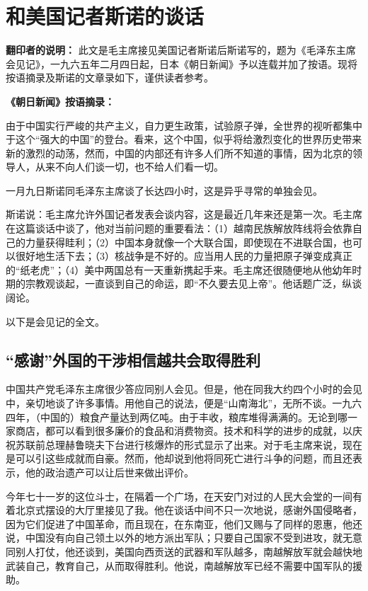 \section[和美国记者斯诺的谈话（一九六五年一月九日）]{和美国记者斯诺的谈话}


\textbf{翻印者的说明：} {\kaishu 此文是毛主席接见美国记者斯诺后斯诺写的，题为《毛泽东主席会见记》，一九六五年二月四日起，日本《朝日新闻》予以连载并加了按语。现将按语摘录及斯诺的文章录如下，谨供读者参考。}

\textbf{《朝日新闻》按语摘录：}

{\kaishu 
由于中国实行严峻的共产主义，自力更生政策，试验原子弹，全世界的视听都集中于这个“强大的中国”的登台。看来，这个中国，似乎将给激烈变化的世界历史带来新的激烈的动荡，然而，中国的内部还有许多人们所不知道的事情，因为北京的领导人，从来不向人们谈一切，也不给人们看一切。

一月九日斯诺同毛泽东主席谈了长达四小时，这是异乎寻常的单独会见。

斯诺说：毛主席允许外国记者发表会谈内容，这是最近几年来还是第一次。毛主席在这篇谈话中谈了，他对当前问题的重要看法：（1）越南民族解放阵线将会依靠自己的力量获得眭利；（2）中国本身就像一个大联合国，即使现在不进联合国，也可以很好地生活下去；（3）核战争是不好的。应当用人民的力量把原子弹变成真正的“纸老虎”；（4）美中两国总有一天重新携起手来。毛主席还很随便地从他幼年时期的宗教观谈起，一直谈到自己的命运，即“不久要去见上帝”。他话题广泛，纵谈阔论。

以下是会见记的全文。}

\subsection{“感谢”外国的干涉相信越共会取得胜利}

中国共产党毛泽东主席很少答应同别人会见。但是，他在同我大约四个小时的会见中，亲切地谈了许多事情。用他自己的说法，便是“山南海北”，无所不谈。一九六四年，（中国的）粮食产量达到两亿吨。由于丰收，粮库堆得满满的。无论到哪一家商店，都可以看到很多廉价的食品和消费物资。技术和科学的进步的成就，以庆祝苏联前总理赫鲁晓夫下台进行核爆炸的形式显示了出来。对于毛主席来说，现在是可以引这些成就而自豪。然而，他却说到他将同死亡进行斗争的问题，而且还表示，他的政治遗产可以让后世来做出评价。

今年七十一岁的这位斗士，在隔着一个广场，在天安门对过的人民大会堂的一间有着北京式摆设的大厅里接见了我。他在谈话中间不只一次地说，感谢外国侵略者，因为它们促进了中国革命，而且现在，在东南亚，他们又赐与了同样的恩惠，他还说，中国没有向自己领土以外的地方派出军队；只要自己国家不受到进攻，就无意同别人打仗，他还谈到，美国向西贡送的武器和军队越多，南越解放军就会越快地武装自己，教育自己，从而取得胜利。他说，南越解放军已经不需要中国军队的援助。

